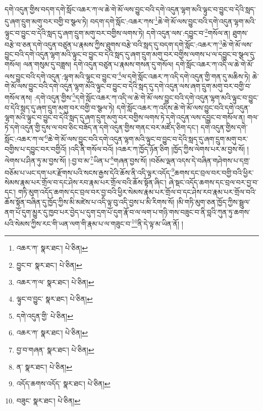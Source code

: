 དགེ་འདུན་གྱིས་བདག་དགེ་སློང་འཆར་ཀ་ལ་ཆེ་གེ་མོ་ལས་བྱུང་བའི་དགེ་འདུན་ལྷག་མའི་ལྟུང་བ་བྱུང་བ་དེའི་སླད་དུ་ཞག་དྲུག་མགུ་བར་བགྱི་བ་སྩལ་ཏེ། བདག་དགེ་སློང་:འཆར་ཀས་\footnote{འཆར་ཀ་  སྣར་ཐང་།  པེ་ཅིན། }ཆེ་གེ་མོ་ལས་བྱུང་བའི་དགེ་འདུན་ལྷག་མའི་ལྟུང་བ་བྱུང་བ་དེའི་སླད་དུ་ཞག་དྲུག་མགུ་བར་བགྱིས་ལགས་ཏེ། དགེ་འདུན་ལས་:དབྱུང་བ་\footnote{བྱུང་བ་  སྣར་ཐང་།  པེ་ཅིན། }གསོལ་ན། ཐུགས་བརྩེ་བ་ཅན་དགེ་འདུན་བཙུན་པ་རྣམས་ཀྱིས་ཐུགས་བརྩེ་བའི་སླད་དུ་བདག་དགེ་སློང་:འཆར་ཀ་\footnote{འཆར་ཀ་ལ་  སྣར་ཐང་།  པེ་ཅིན། }ཆེ་གེ་མོ་ལས་བྱུང་བའི་དགེ་འདུན་ལྷག་མའི་ལྟུང་བ་བྱུང་བ་དེའི་སླད་དུ་ཞག་དྲུག་མགུ་བར་བགྱིས་ལགས་པ་ལ་དབྱུང་བ་སྩལ་དུ་གསོལ། ལན་གསུམ་དུ་བཟླས། དགེ་འདུན་བཙུན་པ་རྣམས་གསན་དུ་གསོལ། དགེ་སློང་འཆར་ཀ་འདི་ལ་ཆེ་གེ་མོ་ལས་བྱུང་བའི་དགེ་འདུན་:ལྷག་མའི་ལྟུང་བ་བྱུང་བ་\footnote{ལྟུང་བ་བྱུང་  སྣར་ཐང་།  པེ་ཅིན། }ལ་དགེ་སློང་འཆར་ཀ་འདི་དགེ་འདུན་གྱི་གན་དུ་མཆིས་ཏེ། ཆེ་གེ་མོ་ལས་བྱུང་བའི་དགེ་འདུན་ལྷག་མའི་ལྟུང་བ་བྱུང་བ་དེའི་སླད་དུ་དགེ་འདུན་ལས་ཞག་དྲུག་མགུ་བར་བགྱི་བ་གསོལ་ནས། :དགེ་འདུན་གྱིས་\footnote{དགེ་འདུན་གྱི་  པེ་ཅིན། }དགེ་སློང་འཆར་ཀ་འདི་ལ་ཆེ་གེ་མོ་ལས་བྱུང་བའི་དགེ་འདུན་ལྷག་མའི་ལྟུང་བ་བྱུང་བ་དེའི་སླད་དུ་ཞག་དྲུག་མགུ་བར་བགྱི་བ་སྩལ་ཏེ། དགེ་སློང་འཆར་ཀ་འདིས་ཆེ་གེ་མོ་ལས་བྱུང་བའི་དགེ་འདུན་ལྷག་མའི་ལྟུང་བ་བྱུང་བ་དེའི་སླད་དུ་ཞག་དྲུག་མགུ་བར་བགྱིས་ལགས་ཏེ་དགེ་འདུན་ལས་དབྱུང་བ་གསོལ་ན། གལ་ཏེ་དགེ་འདུན་གྱི་དུས་ལ་བབ་ཅིང་བཟོད་ན་དགེ་འདུན་གྱིས་གནང་བར་མཛོད་ཅིག་དང་། དགེ་འདུན་གྱིས་དགེ་སློང་:འཆར་ཀ་ལ་\footnote{འཆར་ཀ་  སྣར་ཐང་།  པེ་ཅིན། }ཆེ་གེ་མོ་ལས་བྱུང་བའི་དགེ་འདུན་ལྷག་མའི་ལྟུང་བ་བྱུང་བ་དེའི་སླད་དུ་ཞག་དྲུག་མགུ་བར་བགྱིས་པ་དབྱུང་བར་བགྱིའོ། །འདི་ནི་གསོལ་བའོ། །འཆར་ཀ་ཁྱོད་ཉོན་ཅིག །ཁྱོད་ཀྱིས་ལེགས་པར་མ་བྱས་སོ། །ལེགས་པ་ཤིན་ཏུ་མ་བྱས་སོ། །:བྱ་བ་མ་\footnote{བྱ་བ་གཞན་  སྣར་ཐང་།  པེ་ཅིན། }ཡིན་པ་\footnote{ན་  སྣར་ཐང་།  པེ་ཅིན། }གཞན་བྱས་སོ། །བཅོམ་ལྡན་འདས་དེ་བཞིན་གཤེགས་པ་དགྲ་བཅོམ་པ་ཡང་དག་པར་རྫོགས་པའི་སངས་རྒྱས་དེའི་ཆོས་ནི་འདི་ལྟར་འདོད་\footnote{འདོད་ཆགས་འདོད་  སྣར་ཐང་།  པེ་ཅིན། }ཆགས་དང་བྲལ་བར་བགྱི་བའི་ཕྱིར་སེམས་རྣམ་པར་གྲོལ་བ་དང་ཤེས་རབ་རྣམ་པར་གྲོལ་བའི་ཆོས་སྟོན་ཞིང་། ཞེ་སྡང་འདོད་ཆགས་དང་བྲལ་བར་བྱ་བ་དང་། གཏི་མུག་འདོད་ཆགས་དང་བྲལ་བར་བྱ་བའི་ཕྱིར་སེམས་རྣམ་པར་གྲོལ་བ་དང་ཤེས་རབ་རྣམ་པར་གྲོལ་བའི་ཆོས་སྟོན་བཞིན་དུ་ཁྱོད་ཀྱིས་མི་མཛེས་པ་འདི་ལྟ་བུ་འདི་བྱས་པ་མི་རིགས་སོ། །མི་གཏི་མུག་ཅན་ཁྱོད་ཀྱིས་སྦྲུལ་ནག་པོ་དུག་མྱུར་དུ་ཁྱབ་པར་བྱེད་པ་དུག་དྲག་པོ་དུག་རྣོ་བ་ལ་ལག་པ་གཉི་གས་བཟུང་བ་ནི་བླའི་ཀུན་ཏུ་ཆགས་པའི་སེམས་ཀྱིས་རང་གི་ཡན་ལག་གི་རྣམ་པ་ལ་གཟུང་བ་\footnote{བཟུང་  སྣར་ཐང་།  པེ་ཅིན། }ནི་དེ་ལྟ་མ་ཡིན་ནོ། །
